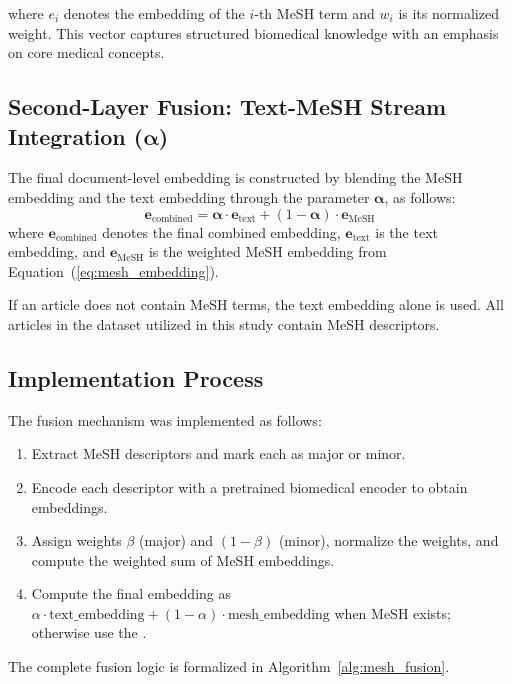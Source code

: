 \documentclass[authorproof,JACIII,researchpaper]{fujipressarticle}
\begin{document}
where $e_i$ denotes the embedding of the $i$-th MeSH term and $w_i$ is its normalized weight.
This vector captures structured biomedical knowledge with an emphasis on core medical concepts.

\subsection{Second-Layer Fusion: Text-MeSH Stream Integration ($\boldsymbol{\alpha}$)}
The final document-level embedding is constructed by blending the MeSH embedding and the text embedding through the parameter $\boldsymbol{\alpha}$, as follows:
\begin{equation}
\boldsymbol{e}_{\text{combined}} = \boldsymbol{\alpha} \cdot \boldsymbol{e}_{\text{text}} + (1 - \boldsymbol{\alpha}) \cdot \boldsymbol{e}_{\text{MeSH}}
\label{eq:combined_embedding}
\end{equation}
where $\boldsymbol{e}_{\text{combined}}$ denotes the final combined embedding, $\boldsymbol{e}_{\text{text}}$ is the text embedding, and $\boldsymbol{e}_{\text{MeSH}}$ is the weighted MeSH embedding from Equation~(\ref{eq:mesh_embedding}).

If an article does not contain MeSH terms, the text embedding alone is used.
All articles in the dataset utilized in this study contain MeSH descriptors.

\subsection{Implementation Process}

The fusion mechanism was implemented as follows:
\begin{enumerate}[leftmargin=*,label=\arabic*.]
    \item Extract MeSH descriptors and mark each as major or minor.
    \item Encode each descriptor with a pretrained biomedical encoder to obtain embeddings.
    \item Assign weights $\beta$ (major) and $(1-\beta)$ (minor), normalize the weights, and compute the weighted sum of MeSH embeddings.
    \item Compute the final embedding as $\alpha\cdot\text{text\_embedding} + (1-\alpha)\cdot\text{mesh\_embedding}$ when MeSH exists; otherwise use the .
\end{enumerate}

The complete fusion logic is formalized in Algorithm~\ref{alg:mesh_fusion}.
\end{document}
